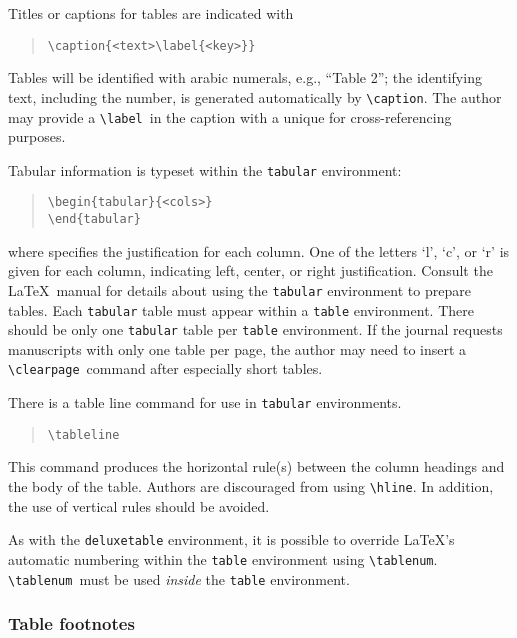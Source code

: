 \documentclass[preprint2]{aastex}
\begin{document}
Titles or captions for tables are indicated with 
\begin{quote} 
\begin{verbatim} 
\caption{<text>\label{<key>}} 
\end{verbatim} 
\end{quote} 
Tables will be identified with arabic numerals, e.g., ``Table 2''; 
the identifying text, including the number, is generated automatically 
by \verb"\caption". 
 The author 
may provide a \verb"\label"\ in the caption with a unique  
for cross-referencing 
purposes. 
 
Tabular information is typeset within the 
\texttt{tabular} environment: 
\begin{quote} 
\begin{verbatim} 
\begin{tabular}{<cols>} 
\end{tabular} 
\end{verbatim} 
\end{quote} 
where  specifies the justification for each column. 
One of the letters `l', `c', or `r' is given for each column, 
indicating left, center, or right justification. 
Consult the \LaTeX\ manual \citep{Lamport} for details about using 
the 
\texttt{tabular} environment 
to prepare tables. 
Each \texttt{tabular} table must appear within a \texttt{table} 
environment. There should be only one \texttt{tabular} table per 
\texttt{table} 
environment. 
If the journal requests manuscripts with only one table per page, 
the author may need to insert a \verb"\clearpage"\ 
 command after 
especially short tables. 
 
There is a table line command for use in \texttt{tabular} 
environments. 
\begin{quote} 
\verb"\tableline" 
 \end{quote} 
This command produces the horizontal rule(s) between the column headings 
and the body of the table. 
Authors are discouraged from using \verb"\hline". 
In addition, the use of vertical rules should be avoided. 
 
As with the \texttt{deluxetable} environment, it 
 is possible to override \LaTeX's automatic numbering within the 
\texttt{table} environment using \verb"\tablenum". 
\verb"\tablenum"\ 
 must be used \emph{inside} the \texttt{table} 
environment. 
 
 
 
\subsubsection{Table footnotes} \label{tabfoot} 
 
\end{document}
